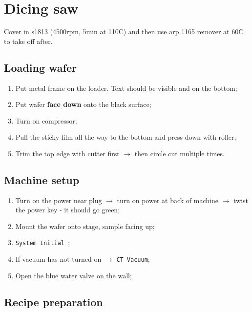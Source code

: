 \section{Dicing saw}

Cover in s1813 (4500rpm, 5min at 110C) and then use arp 1165 remover at 60C to take off after.

\subsection{Loading wafer}
\label{sec:loading-wafer}

\begin{enumerate}
	\item Put metal frame on the loader. Text should be visible and on the bottom;
	\item Put wafer \textbf{face down} onto the black surface;
	\item Turn on compressor;
	\item Pull the sticky film all the way to the bottom and press down with
	      roller;
	\item Trim the top edge with cutter first \(\rightarrow\) then circle cut multiple
	      times.
\end{enumerate}

\subsection{Machine setup}
\label{sec:machine}

\begin{enumerate}
	\item Turn on the power near plug \(\rightarrow\) turn on power at back of machine \(\rightarrow\)
	      twist the power key - it should go green;
	\item Mount the wafer onto stage, sample facing up;
	\item \texttt{System Initial };
	\item If vacuum has not turned on \(\rightarrow\) \texttt{CT Vacuum};
	\item Open the blue water valve on the wall;
\end{enumerate}

\subsection{Recipe preparation}
\label{sec:recipe-preparation}

